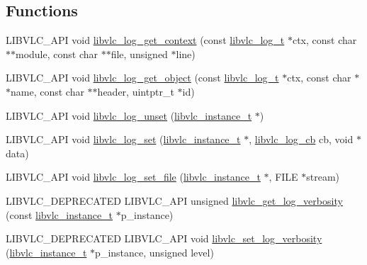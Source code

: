 \subsection*{Functions}
\begin{DoxyCompactItemize}
\item 
L\+I\+B\+V\+L\+C\+\_\+\+A\+PI void \hyperlink{group__libvlc__log_ga9a01433d5badf4a4e8ba3fe1604da242}{libvlc\+\_\+log\+\_\+get\+\_\+context} (const \hyperlink{structvlc__log__t}{libvlc\+\_\+log\+\_\+t} $\ast$ctx, const char $\ast$$\ast$module, const char $\ast$$\ast$file, unsigned $\ast$line)
\item 
L\+I\+B\+V\+L\+C\+\_\+\+A\+PI void \hyperlink{group__libvlc__log_ga99ea1a066d2c682cbf0b161f59ea81b5}{libvlc\+\_\+log\+\_\+get\+\_\+object} (const \hyperlink{structvlc__log__t}{libvlc\+\_\+log\+\_\+t} $\ast$ctx, const char $\ast$$\ast$name, const char $\ast$$\ast$header, uintptr\+\_\+t $\ast$id)
\item 
L\+I\+B\+V\+L\+C\+\_\+\+A\+PI void \hyperlink{group__libvlc__log_ga464c81cbb884ea176ac8c39d50080b17}{libvlc\+\_\+log\+\_\+unset} (\hyperlink{group__libvlc__core_ga316d739a80da4678206c79f4d6c2e284}{libvlc\+\_\+instance\+\_\+t} $\ast$)
\item 
L\+I\+B\+V\+L\+C\+\_\+\+A\+PI void \hyperlink{group__libvlc__log_ga0f01a3cfa2c13a1253e932af6e0b12c5}{libvlc\+\_\+log\+\_\+set} (\hyperlink{group__libvlc__core_ga316d739a80da4678206c79f4d6c2e284}{libvlc\+\_\+instance\+\_\+t} $\ast$, \hyperlink{group__libvlc__log_ga2bc7c11ca559e643b90fc4d55f0c131c}{libvlc\+\_\+log\+\_\+cb} cb, void $\ast$data)
\item 
L\+I\+B\+V\+L\+C\+\_\+\+A\+PI void \hyperlink{group__libvlc__log_ga0dbaa5502842d6d4b33469b8c25deec9}{libvlc\+\_\+log\+\_\+set\+\_\+file} (\hyperlink{group__libvlc__core_ga316d739a80da4678206c79f4d6c2e284}{libvlc\+\_\+instance\+\_\+t} $\ast$, F\+I\+LE $\ast$stream)
\item 
L\+I\+B\+V\+L\+C\+\_\+\+D\+E\+P\+R\+E\+C\+A\+T\+ED L\+I\+B\+V\+L\+C\+\_\+\+A\+PI unsigned \hyperlink{group__libvlc__log_gac15ede92b2992223f9f6f43b07fe3903}{libvlc\+\_\+get\+\_\+log\+\_\+verbosity} (const \hyperlink{group__libvlc__core_ga316d739a80da4678206c79f4d6c2e284}{libvlc\+\_\+instance\+\_\+t} $\ast$p\+\_\+instance)
\item 
L\+I\+B\+V\+L\+C\+\_\+\+D\+E\+P\+R\+E\+C\+A\+T\+ED L\+I\+B\+V\+L\+C\+\_\+\+A\+PI void \hyperlink{group__libvlc__log_ga263f3734e93f4a3a8fa9df3255168c08}{libvlc\+\_\+set\+\_\+log\+\_\+verbosity} (\hyperlink{group__libvlc__core_ga316d739a80da4678206c79f4d6c2e284}{libvlc\+\_\+instance\+\_\+t} $\ast$p\+\_\+instance, unsigned level)

\end{DoxyCompactItemize}
